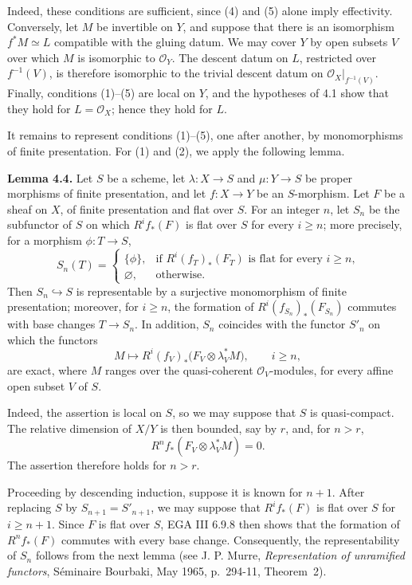 \newpage
Indeed, these conditions are sufficient, since (4) and (5) alone imply
effectivity. Conversely, let \(M\) be invertible on \(Y\), and suppose that
there is an isomorphism \(f^*M\simeq L\) compatible with the gluing datum. We
may cover \(Y\) by open subsets \(V\) over which \(M\) is isomorphic to
\(\mathcal O_Y\). The descent datum on \(L\), restricted over
\(f^{-1}(V)\), is therefore isomorphic to the trivial descent datum on
\(\mathcal O_X|_{f^{-1}(V)}\). Finally, conditions (1)--(5) are local on
\(Y\), and the hypotheses of 4.1 show that they hold for
\(L=\mathcal O_X\); hence they hold for \(L\).

It remains to represent conditions (1)--(5), one after another, by
monomorphisms of finite presentation. For (1) and (2), we apply the following
lemma.

\textbf{Lemma 4.4.} Let \(S\) be a scheme, let
\(\lambda:X\to S\) and \(\mu:Y\to S\) be proper morphisms of finite
presentation, and let \(f:X\to Y\) be an \(S\)-morphism. Let \(F\) be a
sheaf on \(X\), of finite presentation and flat over \(S\). For an integer
\(n\), let \(S_n\) be the subfunctor of \(S\) on which \(R^if_*(F)\) is
flat over \(S\) for every \(i\geq n\); more precisely, for a morphism
\(\phi:T\to S\),
\[
  S_n(T)=
  \begin{cases}
    \{\phi\},&\text{if \(R^i(f_T)_*(F_T)\) is flat for every \(i\geq n\),}\\
    \varnothing,&\text{otherwise.}
  \end{cases}
\]
Then \(S_n\hookrightarrow S\) is representable by a surjective monomorphism
of finite presentation; moreover, for \(i\geq n\), the formation of
\(R^i(f_{S_n})_*(F_{S_n})\) commutes with base changes \(T\to S_n\). In
addition, \(S_n\) coincides with the functor \(S'_n\) on which the functors
\[
  M\longmapsto
  R^i(f_V)_*\bigl(F_V\otimes\lambda_V^*M\bigr),
  \qquad i\geq n,
\]
are exact, where \(M\) ranges over the quasi-coherent
\(\mathcal O_V\)-modules, for every affine open subset \(V\) of \(S\).

Indeed, the assertion is local on \(S\), so we may suppose that \(S\) is
quasi-compact. The relative dimension of \(X/Y\) is then bounded, say by
\(r\), and, for \(n>r\),
\[
  R^nf_*(F_V\otimes\lambda_V^*M)=0.
\]
The assertion therefore holds for \(n>r\).

\newpage
Proceeding by descending induction, suppose it is known for \(n+1\). After
replacing \(S\) by \(S_{n+1}=S'_{n+1}\), we may suppose that
\(R^if_*(F)\) is flat over \(S\) for \(i\geq n+1\). Since \(F\) is flat
over \(S\), EGA III 6.9.8 then shows that the formation of \(R^nf_*(F)\)
commutes with every base change. Consequently, the representability of
\(S_n\) follows from the next lemma (see J. P. Murre,
\emph{Representation of unramified functors}, S\'eminaire Bourbaki, May
1965, p.~294-11, Theorem~2).

